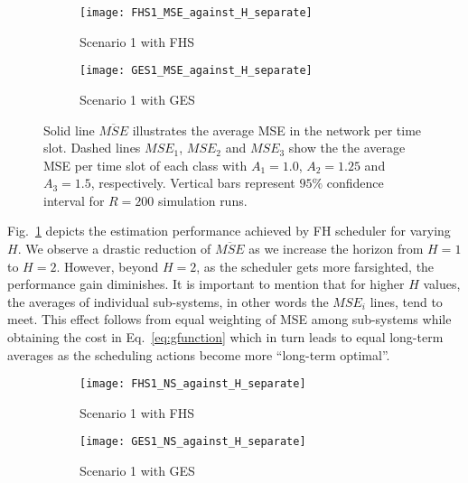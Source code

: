 \begin{figure}[htbp]
  \centering
  \begin{subfigure}[b]{0.49\textwidth}
      \centering
      \texttt{[image: FHS1\_MSE\_against\_H\_separate]}
      \caption{Scenario 1 with FHS}
  \end{subfigure}
  \hfill
  \begin{subfigure}[b]{0.49\textwidth}
      \centering
      \texttt{[image: GES1\_MSE\_against\_H\_separate]}
      \caption{Scenario 1 with GES}
  \end{subfigure}
     \caption[Scenario 1: Average MSE vs. finite horizon $H$]{Solid line
     $\overline{MSE}$ illustrates the average MSE in the network per time slot.
     Dashed lines $MSE_1$, $MSE_2$ and $MSE_3$ show the the average MSE per time
     slot of each class with $A_1=1.0$, $A_2=1.25$ and $A_3=1.5$, respectively.
     Vertical bars represent $95\%$ confidence interval for $R=200$ simulation
     runs.}
     \label{fig:MSEavg}
\end{figure}

Fig.~\ref{fig:MSEavg} depicts the estimation performance achieved by FH
scheduler for varying $H$. We observe a drastic reduction of $\overline{MSE}$ as
we increase the horizon from $H=1$ to $H=2$. However, beyond $H=2$, as the
scheduler gets more farsighted, the performance gain diminishes. It is important
to mention that for higher $H$ values, the averages of individual sub-systems,
in other words the $MSE_i$ lines, tend to meet. This effect follows from equal
weighting of MSE among sub-systems while obtaining the cost in
Eq.~\eqref{eq:gfunction} which in turn leads to equal long-term averages as the
scheduling actions become more ``long-term optimal''. 

\begin{figure}[htbp]
  \centering
  \begin{subfigure}[b]{0.49\textwidth}
      \centering
      \texttt{[image: FHS1\_NS\_against\_H\_separate]}
      \caption{Scenario 1 with FHS}
  \end{subfigure}
  \hfill
  \begin{subfigure}[b]{0.49\textwidth}
      \centering
      \texttt{[image: GES1\_NS\_against\_H\_separate]}
      \caption{Scenario 1 with GES}
  \end{subfigure}
     \caption[Scenario1: Network resources share among heterogenous subsystems
     vs. finite horizon $H$]{}
     \label{fig:networkshare}
\end{figure}

